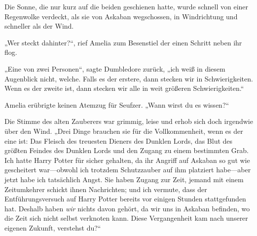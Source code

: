 \later

Die Sonne, die nur kurz auf die beiden geschienen hatte, wurde schnell von einer Regenwolke verdeckt, als sie von Askaban wegschossen, in Windrichtung und schneller als der Wind.

„Wer steckt dahinter?“, rief Amelia zum Besenstiel der einen Schritt neben ihr flog.

„Eine von zwei Personen“, sagte Dumbledore zurück, „ich weiß in diesem Augenblick nicht, welche. Falls es der erstere, dann stecken wir in Schwierigkeiten. Wenn es der zweite ist, dann stecken wir alle in weit größeren Schwierigkeiten.“

Amelia erübrigte keinen Atemzug für Seufzer. „Wann wirst du es wissen?“

Die Stimme des alten Zauberers war grimmig, leise und erhob sich doch irgendwie über den Wind. „Drei Dinge brauchen sie für die Vollkommenheit, wenn es der eine ist: Das Fleisch des treuesten Dieners des Dunklen Lords, das Blut des größten Feindes des Dunklen Lords und den Zugang zu einem bestimmten Grab. Ich hatte Harry Potter für sicher gehalten, da ihr Angriff auf Askaban so gut wie gescheitert war—obwohl ich trotzdem Schutzzauber auf ihm platziert habe—aber jetzt habe ich tatsächlich Angst. Sie haben Zugang zur Zeit, jemand mit einem Zeitumkehrer schickt ihnen Nachrichten; und ich vermute, dass der Entführungsversuch auf Harry Potter bereits vor einigen Stunden stattgefunden hat. Deshalb haben \emph{wir} nichts davon gehört, da wir uns in Askaban befinden, wo die Zeit sich nicht selbst verknoten kann. Diese Vergangenheit kam nach unserer eigenen Zukunft, verstehst du?“

